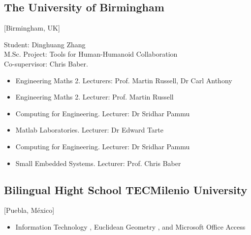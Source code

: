 \documentclass{mycv}
\begin{document}
\subsection{The University of Birmingham}[Birmingham, UK]
\vspace{1mm}
\begin{positions}
\end{positions}
Student: Dinghuang Zhang \\
M.Sc. Project: Tools for Human-Humanoid Collaboration \\
Co-supervisor: Chris Baber. 

\begin{positions}
\end{positions}
\begin{itemize}
	I led topic presentations and preparation for student evaluation
	\vspace{-1mm}
	\item Engineering Maths 2. Lecturers: Prof. Martin Russell, Dr Carl Anthony 
	\item Engineering Maths 2. Lecturer: Prof. Martin Russell 
	\item Computing for Engineering. Lecturer: Dr Sridhar Pammu  
	\item Matlab Laboratories. Lecturer: Dr Edward Tarte  
	\item Computing for Engineering. Lecturer: Dr Sridhar Pammu  
	\item Small Embedded Systems. Lecturer: Prof. Chris Baber   \\
\end{itemize}


\subsection{Bilingual Hight School TECMilenio University}[Puebla, M\'exico]
\vspace{1mm}
\begin{positions}
\end{positions}
\begin{itemize}
	I led curriculum preparaton, topic presentation and preparation for student evaluation
	\vspace{-1mm}
	\item
	Information Technology \href{https://sites.google.com/site/perezxochicale/teaching/iit}{\faExternalLink*}, 
	Euclidean Geometry  \href{https://sites.google.com/site/perezxochicale/teaching/euclidean-geometry}{\faExternalLink*}, and 
	Microsoft Office Access \href{https://sites.google.com/site/perezxochicale/teaching/moa}{\faExternalLink*}
\end{itemize}
\end{document}
